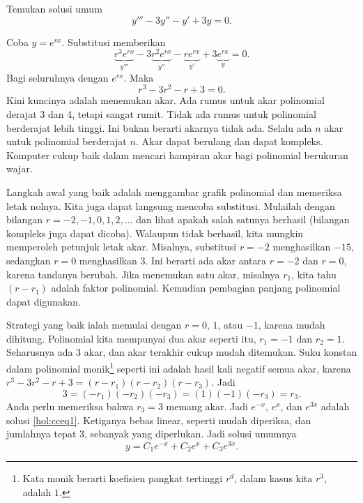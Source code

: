 \begin{example}
Temukan solusi umum
\begin{equation} \label{hol:cceq1}
y''' - 3 y'' - y' + 3y = 0 .
\end{equation}

Coba $y = e^{rx}$. Substitusi memberikan
\begin{equation*}
\underbrace{r^3 e^{rx}}_{y'''} - 3 \underbrace{r^2 e^{rx}}_{y''} -
\underbrace{r e^{rx}}_{y'} + 3 \underbrace{e^{rx}}_{y} = 0 .
\end{equation*}
Bagi seluruhnya dengan $e^{rx}$. Maka
\begin{equation*}
r^3 - 3 r^2 - r + 3 = 0 .
\end{equation*}
Kini kuncinya adalah menemukan akar. Ada rumus untuk akar polinomial derajat 3 dan 4, tetapi sangat rumit. Tidak ada rumus untuk polinomial berderajat lebih tinggi. Ini bukan berarti akarnya tidak ada. Selalu ada $n$ akar untuk polinomial berderajat $n$. Akar dapat berulang dan dapat kompleks. Komputer cukup baik dalam mencari hampiran akar bagi polinomial berukuran wajar.

Langkah awal yang baik adalah menggambar grafik polinomial dan memeriksa letak nolnya. Kita juga dapat langsung mencoba substitusi. Mulailah dengan bilangan $r=-2,-1,0,1,2,\ldots$ dan lihat apakah salah satunya berhasil (bilangan kompleks juga dapat dicoba). Walaupun tidak berhasil, kita mungkin memperoleh petunjuk letak akar. Misalnya, substitusi $r=-2$ menghasilkan $-15$, sedangkan $r=0$ menghasilkan $3$. Ini berarti ada akar antara $r=-2$ dan $r=0$, karena tandanya berubah. Jika menemukan satu akar, misalnya $r_1$, kita tahu $(r-r_1)$ adalah faktor polinomial. Kemudian pembagian panjang polinomial dapat digunakan.

Strategi yang baik ialah memulai dengan $r=0$, $1$, atau $-1$, karena mudah dihitung. Polinomial kita mempunyai dua akar seperti itu, $r_1 = -1$ dan $r_2 = 1$. Seharusnya ada 3 akar, dan akar terakhir cukup mudah ditemukan. Suku konstan dalam polinomial monik\footnote{Kata monik berarti koefisien pangkat tertinggi $r^d$, dalam kasus kita $r^3$, adalah $1$.} seperti ini adalah hasil kali negatif semua akar, karena $r^3 - 3 r^2 - r + 3 = (r-r_1)(r-r_2)(r-r_3)$. Jadi
\begin{equation*}
3 = (-r_1)(-r_2)(-r_3) = (1)(-1)(-r_3) = r_3 .
\end{equation*}
Anda perlu memeriksa bahwa $r_3 = 3$ memang akar. Jadi $e^{-x}$, $e^{x}$, dan $e^{3x}$ adalah solusi \eqref{hol:cceq1}. Ketiganya bebas linear, seperti mudah diperiksa, dan jumlahnya tepat 3, sebanyak yang diperlukan. Jadi solusi umumnya
\begin{equation*}
y = C_1 e^{-x} + C_2 e^{x} + C_3 e^{3x} .
\end{equation*}


\end{example}
